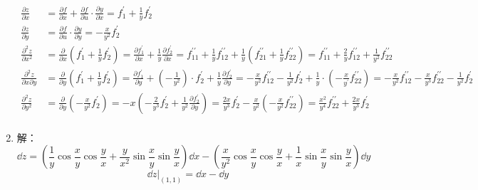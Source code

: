 \begin{enumerate}
$$\begin{aligned}
	\frac{\partial z}{\partial x}&=\frac{\partial f}{\partial x}+\frac{\partial f}{\partial u}\cdot \frac{\partial y}{\partial x}=f_{1}^{\prime}+\frac{1}{y}f_{2}^{\prime}\\
	\frac{\partial z}{\partial y}&=\frac{\partial f}{\partial u}\cdot \frac{\partial y}{\partial y}=-\frac{x}{y^2}f_{2}^{\prime}\\
	\frac{\partial ^2z}{\partial x^2}&=\frac{\partial}{\partial x}\left( f_{1}^{\prime}+\frac{1}{y}f_{2}^{\prime} \right) =\frac{\partial f_{1}^{\prime}}{\partial x}+\frac{1}{y}\frac{\partial f_{2}^{\prime}}{\partial x}=f_{11}^{\prime\prime}+\frac{1}{y}f_{12}^{\prime\prime}+\frac{1}{y}\left( f_{21}^{\prime\prime}+\frac{1}{y}f_{22}^{\prime\prime} \right) =f_{11}^{\prime\prime}+\frac{2}{y}f_{12}^{\prime\prime}+\frac{1}{y^2}f_{22}^{\prime\prime}\\
	\frac{\partial ^2z}{\partial x\partial y}&=\frac{\partial}{\partial y}\left( f_{1}^{\prime}+\frac{1}{y}f_{2}^{\prime} \right) =\frac{\partial f_{1}^{\prime}}{\partial y}+\left( -\frac{1}{y^2} \right) \cdot f_{2}^{\prime}+\frac{1}{y}\frac{\partial f_{2}^{\prime}}{\partial y}=-\frac{x}{y^2}f_{12}^{\prime\prime}-\frac{1}{y^2}f_{2}^{\prime}+\frac{1}{y}\cdot \left( -\frac{x}{y^\prime}f_{22}^{\prime\prime} \right) =-\frac{x}{y^2}f_{12}^{\prime\prime}-\frac{x}{y^3}f_{22}^{\prime\prime}-\frac{1}{y^2}f_{2}^{\prime}\\
	\frac{\partial ^2z}{\partial y^2}&=\frac{\partial}{\partial y}\left( -\frac{x}{y^2}f_{2}^{\prime} \right) =-x\left( -\frac{2}{y^3}f_{2}^{\prime}+\frac{1}{y^2}\frac{\partial f_{2}^{\prime}}{\partial y} \right) =\frac{2x}{y^3}f_{2}^{\prime}-\frac{x}{y^2}\left( -\frac{x}{y^2}f_{22}^{\prime\prime} \right) =\frac{x^2}{y^4}f_{22}^{\prime\prime}+\frac{2x}{y^3}f_{2}^{\prime}\\
\end{aligned}
$$
	\item 解：\[\dd z=\left(\frac{1}{y} \cos \frac{x}{y} \cos \frac{y}{x}+\frac{y}{x^{2}} \sin \frac{x}{y} \sin \frac{y}{x}\right) \dd x -\left(\frac{x}{y^{2}} \cos \frac{x}{y} \cos \frac{y}{x}+\frac{1}{x} \sin \frac{x}{y} \sin \frac{y}{x}\right) \dd y\]
\[ \dd z \big|_{(1, 1)}=\dd x -\dd y\]
\end{enumerate}
